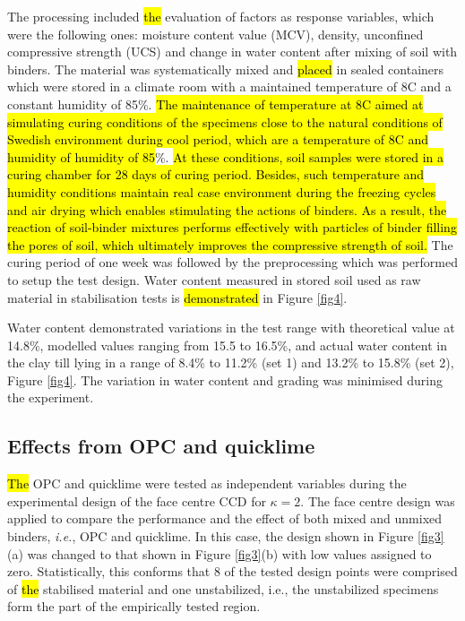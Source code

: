 \documentclass[eprint,
]{actapoly}
\begin{document}
The processing included \hl{the }evaluation of factors as response variables, which were the following ones: moisture content value (MCV), density, unconfined compressive strength (UCS) and change in water content after mixing of soil with binders. The material was systematically mixed and \hl{placed }in sealed containers which were stored in a climate room with a maintained temperature of 8\degree C and a constant humidity of 85\%. \hl{The maintenance of temperature at 8}\degree \hl{C aimed at simulating curing conditions of the specimens close to the natural conditions of Swedish environment during cool period, which are a temperature of 8}\degree \hl{C and humidity of humidity of 85}\%. \hl{At these conditions, soil samples were stored in a curing chamber for 28 days of curing period. Besides, such temperature and humidity conditions maintain real case environment during the freezing cycles and air drying which enables stimulating the actions of binders. As a result, the reaction of soil-binder mixtures performs effectively with particles of binder filling the pores of soil, which ultimately improves the compressive strength of soil. }The curing period of one week was followed by the preprocessing which was performed to setup the test design. Water content measured in stored soil used as raw material in stabilisation tests is \hl{demonstrated }in Figure \ref{fig4}. 

Water content demonstrated variations in the test range with theoretical value at 14.8\%, modelled values ranging from 15.5 to 16.5\%, and actual water content in the clay till lying in a range of 8.4\% to 11.2\% (set 1) and 13.2\% to 15.8\% (set 2), Figure \ref{fig4}. The variation in water content and grading was minimised during the experiment.

\subsection{Effects from OPC and quicklime}
\hl{The }OPC and quicklime were tested as independent variables during the  experimental design of the face centre CCD for $\kappa=2$. The face centre design was applied to compare the performance and the effect of both mixed and unmixed binders, \emph{i.e.}, OPC and quicklime. In this case, the design shown in Figure \ref{fig3}(a) was changed to that shown in Figure \ref{fig3}(b) with low values\hl{ }assigned to zero. Statistically, this conforms that 8 of the tested design points were comprised of \hl{the }stabilised material and one unstabilized, i.e., the unstabilized specimens form the part of the empirically tested region. 
\end{document}
